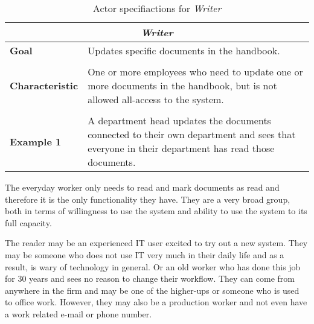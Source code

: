 \begin{table}[H]
	\centering
	\begin{tabular}{l p{11.3cm}}
		\hline
		\multicolumn{2}{c}{\textbf{\textit{Writer}}}\\
		\hline
		\textbf{Goal} & Updates specific documents in the handbook. \\
	 	 &  \\

		\textbf{Characteristic} &  One or more employees who need to update one or more documents in the handbook, but is not allowed all-access to the system. \\
		 &  \\

		\textbf{Example 1}
		& A department head updates the documents connected to their own department and sees that everyone in their department has read those documents.\\

		\hline
	\end{tabular}
	\caption{Actor specifiactions for \textit{Writer}}\label{tab:Actor-write}
\end{table}

The everyday worker only needs to read and mark documents as read and therefore it is the only functionality they have.
They are a very broad group, both in terms of willingness to use the system and ability to use the system to its full capacity.

The reader may be an experienced IT user excited to try out a new system.
They may be someone who does not use IT very much in their daily life and as a result, is wary of technology in general.
Or an old worker who has done this job for 30 years and sees no reason to change their workflow.
They can come from anywhere in the firm and may be one of the higher-ups or someone who is used to office work.
However, they may also be a production worker and not even have a work related e-mail or phone number.

